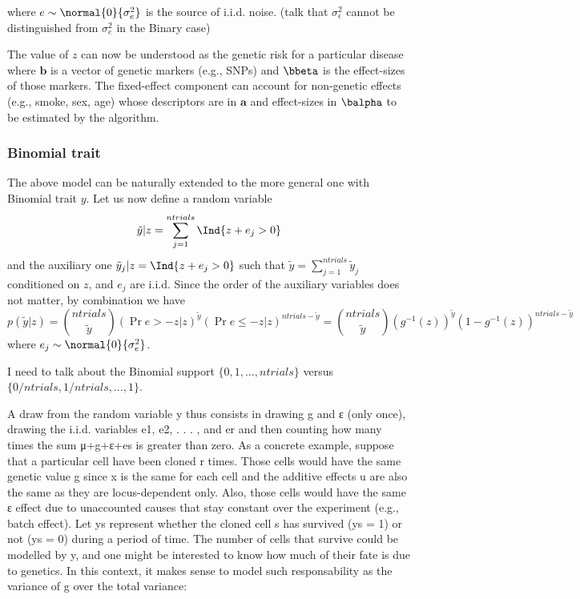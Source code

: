 where $e \sim \normal{0}{\sigma_e^2}$ is the source of i.i.d. noise. (talk that $\sigma_{\epsilon}^2$ cannot be distinguished from $\sigma_e^2$ in the Binary case)

The value of $z$ can now be understood as the genetic risk for a particular disease where $\mathbf b$ is a vector of genetic markers (e.g., SNPs) and $\bbeta$ is the effect-sizes of those markers. The fixed-effect component can account for non-genetic effects (e.g., smoke, sex, age) whose descriptors are in $\mathbf a$ and effect-sizes in $\balpha$ to be estimated by the algorithm.

\subsubsection{Binomial trait}

The above model can be naturally extended to the more general one with Binomial trait $y$. Let us now define a random variable
$$
\tilde y | z = \sum_{j=1}^{ntrials} \Ind{z+e_j > 0}
$$
and the auxiliary one $\tilde y_j | z = \Ind{z+e_j > 0}$ such that $\tilde y = \sum_{j=1}^{ntrials} \tilde y_j$ conditioned on $z$, and $e_j$ are i.i.d. Since the order of the auxiliary variables does not matter, by combination we have
$$
p(\tilde y|z) = {ntrials \choose \tilde y} (\Pr{e > -z|z})^{\tilde y} (\Pr{e \leq -z|z})^{ntrials - \tilde y} =
	{ntrials \choose \tilde y} (g^{-1}(z))^{\tilde y} (1-g^{-1}(z))^{ntrials - \tilde y}
$$
where $e_j \sim \normal{0}{\sigma_e^2}$.

I need to talk about the Binomial support $\{0, 1, \dots, ntrials\}$ versus $\{0/ntrials, 1/ntrials, \dots, 1\}$.

A draw from the random variable y thus consists in drawing g and ε (only once), drawing
the i.i.d. variables e1, e2, . . . , and er and then counting how many times the sum μ+g+ε+es
is greater than zero. As a concrete example, suppose that a particular cell have been cloned
r times. Those cells would have the same genetic value g since x is the same for each cell
and the additive effects u are also the same as they are locus-dependent only. Also, those
cells would have the same ε effect due to unaccounted causes that stay constant over the
experiment (e.g., batch effect). Let ys represent whether the cloned cell s has survived
(ys = 1) or not (ys = 0) during a period of time. The number of cells that survive could
be modelled by y, and one might be interested to know how much of their fate is due to
genetics. In this context, it makes sense to model such responsability as the variance of g
over the total variance:

